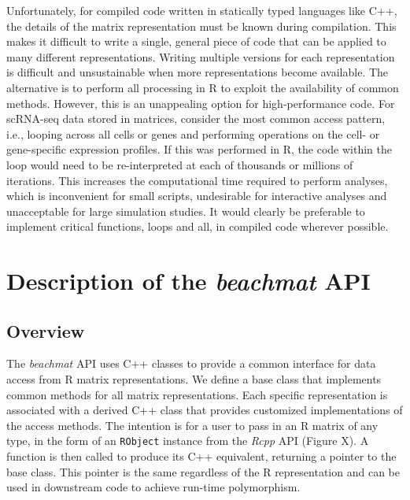 \documentclass[10pt,letterpaper]{article}
\newcommand{\beachmat}{\textit{beachmat}}
\newcommand{\code}[1]{\texttt{#1}}
\begin{document}
Unfortunately, for compiled code written in statically typed languages like C++, the details of the matrix representation must be known during compilation.
This makes it difficult to write a single, general piece of code that can be applied to many different representations.
Writing multiple versions for each representation is difficult and unsustainable when more representations become available.
The alternative is to perform all processing in R to exploit the availability of common methods.
However, this is an unappealing option for high-performance code.
For scRNA-seq data stored in matrices, consider the most common access pattern, i.e., looping across all cells or genes and performing operations on the cell- or gene-specific expression profiles.
If this was performed in R, the code within the loop would need to be re-interpreted at each of thousands or millions of iterations.
This increases the computational time required to perform analyses, which is inconvenient for small scripts, undesirable for interactive analyses and unacceptable for large simulation studies.
It would clearly be preferable to implement critical functions, loops and all, in compiled code wherever possible.


\section*{Description of the \beachmat{} API}

\subsection*{Overview}
The \beachmat{} API uses C++ classes to provide a common interface for data access from R matrix representations.
We define a base class that implements common methods for all matrix representations.
Each specific representation is associated with a derived C++ class that provides customized implementations of the access methods.
The intention is for a user to pass in an R matrix of any type, in the form of an \code{RObject} instance from the \textit{Rcpp} API (Figure X).
A function is then called to produce its C++ equivalent, returning a pointer to the base class.
This pointer is the same regardless of the R representation and can be used in downstream code to achieve run-time polymorphism.
\end{document}
